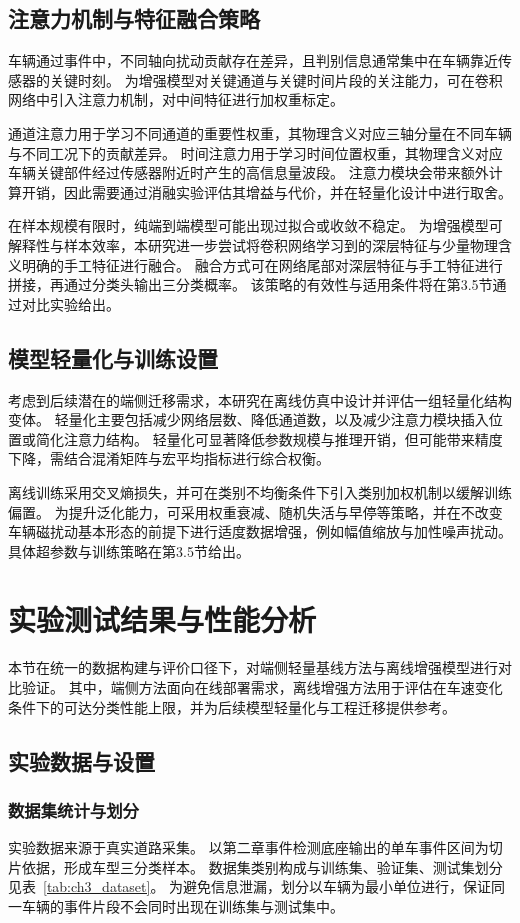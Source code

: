 \documentclass{xdupgthesis}
\begin{document}
\subsection{注意力机制与特征融合策略}
车辆通过事件中，不同轴向扰动贡献存在差异，且判别信息通常集中在车辆靠近传感器的关键时刻。
为增强模型对关键通道与关键时间片段的关注能力，可在卷积网络中引入注意力机制，对中间特征进行加权重标定。

通道注意力用于学习不同通道的重要性权重，其物理含义对应三轴分量在不同车辆与不同工况下的贡献差异。
时间注意力用于学习时间位置权重，其物理含义对应车辆关键部件经过传感器附近时产生的高信息量波段。
注意力模块会带来额外计算开销，因此需要通过消融实验评估其增益与代价，并在轻量化设计中进行取舍。

在样本规模有限时，纯端到端模型可能出现过拟合或收敛不稳定。
为增强模型可解释性与样本效率，本研究进一步尝试将卷积网络学习到的深层特征与少量物理含义明确的手工特征进行融合。
融合方式可在网络尾部对深层特征与手工特征进行拼接，再通过分类头输出三分类概率。
该策略的有效性与适用条件将在第3.5节通过对比实验给出。

\subsection{模型轻量化与训练设置}
考虑到后续潜在的端侧迁移需求，本研究在离线仿真中设计并评估一组轻量化结构变体。
轻量化主要包括减少网络层数、降低通道数，以及减少注意力模块插入位置或简化注意力结构。
轻量化可显著降低参数规模与推理开销，但可能带来精度下降，需结合混淆矩阵与宏平均指标进行综合权衡。

离线训练采用交叉熵损失，并可在类别不均衡条件下引入类别加权机制以缓解训练偏置。
为提升泛化能力，可采用权重衰减、随机失活与早停等策略，并在不改变车辆磁扰动基本形态的前提下进行适度数据增强，例如幅值缩放与加性噪声扰动。
具体超参数与训练策略在第3.5节给出。


\section{实验测试结果与性能分析}

本节在统一的数据构建与评价口径下，对端侧轻量基线方法与离线增强模型进行对比验证。
其中，端侧方法面向在线部署需求，离线增强方法用于评估在车速变化条件下的可达分类性能上限，并为后续模型轻量化与工程迁移提供参考。

\subsection{实验数据与设置}
\subsubsection{数据集统计与划分}
实验数据来源于真实道路采集。
以第二章事件检测底座输出的单车事件区间为切片依据，形成车型三分类样本。
数据集类别构成与训练集、验证集、测试集划分见表~\ref{tab:ch3_dataset}。
为避免信息泄漏，划分以车辆为最小单位进行，保证同一车辆的事件片段不会同时出现在训练集与测试集中。
\end{document}
